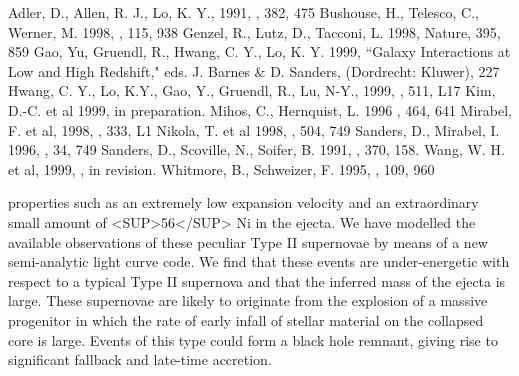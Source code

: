 {{{{{{{{{{{{{{\begin{references}
\begin{references}
 Adler, D., Allen, R. J., Lo, K. Y., 1991, \apj, 382, 475
 Bushouse, H., Telesco, C., Werner, M. 1998, \aj, 115, 938
 Genzel, R., Lutz, D., Tacconi, L. 1998, Nature, 395, 859
 Gao, Yu, Gruendl, R., Hwang, C. Y., Lo, K. Y. 1999, ``Galaxy
Interactions at Low and High Redshift," eds. J. Barnes \& D. Sanders, (Dordrecht: Kluwer), 227
 Hwang, C. Y., Lo, K.Y., Gao, Y., Gruendl, R., Lu, N-Y., 1999, \apjl, 511, L17
 Kim, D.-C. et al 1999, in preparation.
 Mihos, C., Hernquist, L. 1996 \apj, 464, 641
 Mirabel, F. et al, 1998, \aap, 333, L1
 Nikola, T. et al 1998, \apj, 504, 749
 Sanders, D., Mirabel, I. 1996, \araa, 34, 749
 Sanders, D., Scoville, N., Soifer, B. 1991, \apjl, 370, 158.
 Wang, W. H. et al, 1999, \apj, in revision.
 Whitmore, B., Schweizer, F. 1995, \aj, 109, 960

\end{references}


properties such as an extremely low expansion velocity and an
extraordinary small amount of <SUP>56</SUP> Ni in the ejecta. We have
modelled the available observations of these peculiar Type II
supernovae by means of a new semi-analytic light curve code. We find
that these events are under-energetic with respect to a typical Type
II supernova and that the inferred mass of the ejecta is large. These
supernovae are likely to originate from the explosion of a massive
progenitor in which the rate of early infall of stellar material on
the collapsed core is large. Events of this type could form a black
hole remnant, giving rise to significant fallback and late-time
accretion.


\end{references}}}}}}}}}}}}}}}
